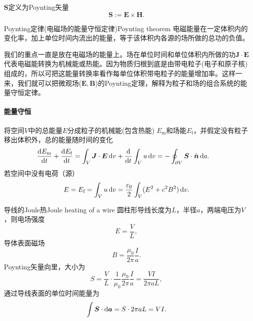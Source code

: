 $\bm S$定义为Poynting矢量
\begin{equation}
    \bm S:=\bm E\times\bm H.
\end{equation}
\begin{theorem}{Poynting定律(电磁场的能量守恒定律)}{Poynting theorem}
    电磁能量在一定体积内的变化率，加上单位时间内流出的能量，等于该体积内各源的场所做的总功的负值。
\end{theorem}
我们的重点一直是放在电磁场的能量上。场在单位时间和单位体积内所做的功$\bm J\cdot\bm E$代表电磁能转换为机械能或热能。因为物质归根到底是由带电粒子(电子和原子核)组成的，所以可把这能量转换率看作每单位体积带电粒子的能量增加率。这样一来，我们就可以把微观场($\bm E,\bm B$)的Poynting定理，解释为粒子和场的组合系统的能量守恒定律。%
\paragraph{能量守恒}
将空间$V$中的总能量$E$分成粒子的机械能(包含热能) $E_\text{m}$和场能$E_\text{f}$，并假定没有粒子移出体积外，总的能量随时间的变化
\begin{align*}
    \dv{E_\text m}t+\dv{E_\text f}t&=\int_V\bm J\cdot\bm E\d v+\dd t\int_Vu\d v=-\oint_{\p V}\bm S\cdot\uvec n\d a.
\end{align*}
若空间中没有电荷（源）
\[
    E=E_\text f=\int_Vu\mathop{}\!\mathrm{d} v=\frac{\varepsilon_0}2\int_V(E^2+c^2B^2)\mathop{}\!\mathrm{d} v.
\]
\begin{example}{导线的Joule热}{Joule heating of a wire}
    圆柱形导线长度为$L$，半径$a$，两端电压为$V$，则电场强度
    \[
        E=\frac VL,
    \]
    导体表面磁场
    \[
        B=\frac{\mu_0}{2\pi}\frac Ia.
    \]
    Poynting矢量向里，大小为
    \[
        S=\frac VL\cdot\frac1{\mu_0}\frac{\mu_0}{2\pi}\frac Ia=\frac{VI}{2\pi aL},
    \]
    通过导线表面的单位时间能量为
    \[
        \int \bm S\cdot\mathop{}\!\mathrm{d}\bm a=S\cdot 2\pi aL=VI.
    \]
\end{example}
